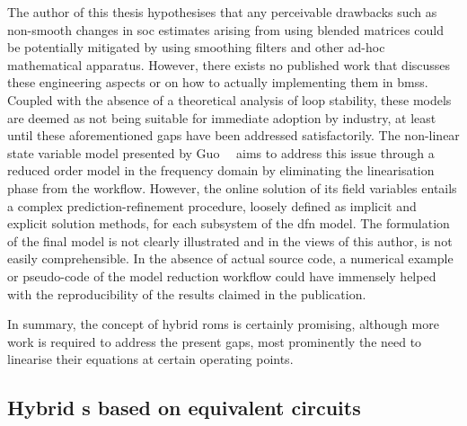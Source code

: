 The  author of  this thesis  hypothesises  that any  perceivable drawbacks  such
as  non-smooth  changes  in  \gls{soc}  estimates  arising  from  using  blended
matrices could  be potentially  mitigated by using  smoothing filters  and other
ad-hoc  mathematical apparatus.  However, there  exists no  published work  that
discusses these engineering  aspects or on how to actually  implementing them in
\glspl{bms}.  Coupled  with  the  absence  of a  theoretical  analysis  of  loop
stability,  these  models  are  deemed  as  not  being  suitable  for  immediate
adoption  by  industry, at  least  until  these  aforementioned gaps  have  been
addressed  satisfactorily.  The non-linear  state  variable  model presented  by
Guo~\etal{}~\cite{Guo2017} aims  to address this  issue through a  reduced order
model in  the frequency domain by  eliminating the linearisation phase  from the
workflow. However, the online solution of  its field variables entails a complex
prediction-refinement  procedure,  loosely  defined  as  implicit  and  explicit
solution methods, for each subsystem of  the \gls{dfn} model. The formulation of
the final model is  not clearly illustrated and in the views  of this author, is
not easily  comprehensible. In the  absence of  actual source code,  a numerical
example  or pseudo-code  of the  model reduction  workflow could  have immensely
helped with the reproducibility of the results claimed in the publication.

In summary, the  concept of hybrid \glspl{rom} is  certainly promising, although
more work is required to address the  present gaps, most prominently the need to
linearise their equations at certain operating points.


\subsection{Hybrid s based on equivalent circuits}

